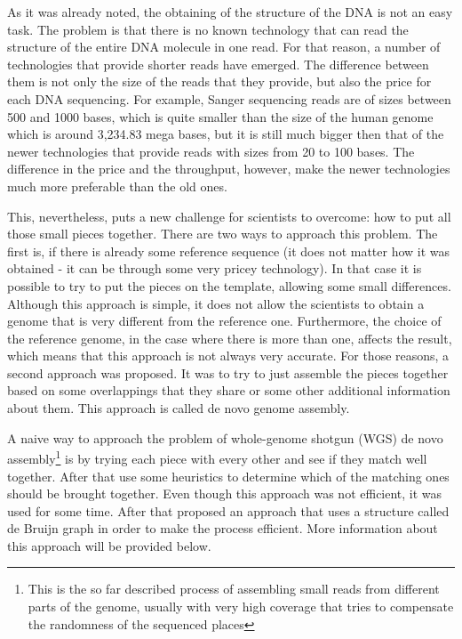 \documentclass[11pt]{article}
\begin{document}
As it was already noted, the obtaining of the structure of the DNA is not an
easy task. The problem is that there is no known technology that can read the
structure of the entire DNA molecule in one read. For that reason, a number of
technologies that provide shorter reads have emerged. The difference between
them is not only the size of the reads that they provide, but also the price for
each DNA sequencing. For example, Sanger sequencing reads are of sizes between
500 and 1000 bases, which is quite smaller than the size of the human genome which
is around 3,234.83 mega bases, but it is still much bigger then that of the
newer technologies that provide reads with sizes from 20 to 100 bases. The
difference in the price and the throughput, however, make the newer technologies
much more preferable than the old ones.

This, nevertheless, puts a new challenge for scientists to overcome: how to put
all those small pieces together. There are two ways to approach this problem.
The first is, if there is already some reference sequence (it does not matter
how it was obtained - it can be through some very pricey technology). In that
case it is possible to try to put the pieces on the template, allowing some
small differences. Although this approach is simple, it does not allow the scientists to
obtain a genome that is very different from the reference one. Furthermore, the
choice of the reference genome, in the case where there is more than one,
affects the result, which means that this approach is not always very accurate.
For those reasons, a second approach was proposed. It was to try to just
assemble the pieces together based on some overlappings that they share or some
other additional information about them. This approach is called de novo genome
assembly.

A naive way to approach the problem of whole-genome shotgun (WGS) de novo
assembly\footnote{This is the so far described process of assembling small reads
from different parts of the genome, usually with very high coverage that tries
to compensate the randomness of the sequenced places} is by trying each piece
with every other and see if they match well together. After that use some
heuristics to determine which of the matching ones should be brought together.
Even though this approach was not efficient, it was used for some time. After
that \cite{pevzner-et-all-2001} proposed an approach that uses a structure
called de Bruijn graph in order to make the process efficient. More information
about this approach will be provided below.
\end{document}
